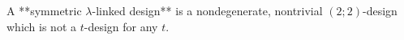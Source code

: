 A **symmetric $\lambda$-linked design** is a nondegenerate, nontrivial $(2; 2)$-design which is not a $t$-design for any $t$.

